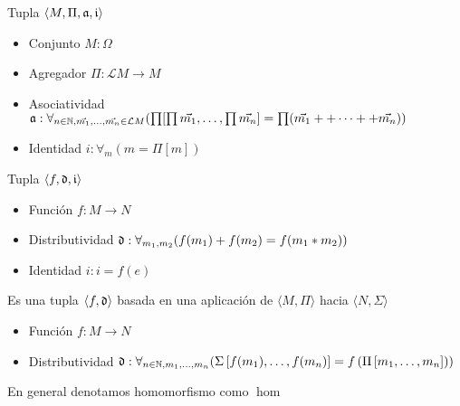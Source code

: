 \begin{defn}[Agregación]
\end{defn}
Tupla $\langle M, \Pi, \mathfrak{a}, \mathfrak{i} \rangle$  
\begin{itemize}
\item Conjunto $M: \Omega$ 
\item Agregador $\Pi: \mathcal{L} M \to M$
\item Asociatividad $\mathfrak{a}: \forall_{ n \in \mathbb{N}, \vec{m_1}, \dots, \vec{m_n} \in \mathcal{L}M}
(\prod [\prod \vec{m_1}, \dots , \prod \vec{m_n}] = \prod(\vec{m_1} ++ \dots ++ \vec{m_n}))$
\item Identidad $i: \forall_m ( m = \Pi[m])$
\end{itemize}

\begin{defn}
\end{defn}
Tupla $\langle f, \mathfrak{d}, \mathfrak{i} \rangle$ 
\begin{itemize}
\item Función $f : M \to N$ 
\item Distributividad $\mathfrak{d} : \forall_{m_1, m_2}( f(m_1) + f(m_2) = f(m_1 * m_2))$
\item Identidad ${i} : i = f(e)$
\end{itemize}

\begin{defn}
\end{defn}
Es una tupla $\langle f, \mathfrak{d} \rangle$ basada en una aplicación de $\langle M, \Pi \rangle$ hacia $\langle N, \Sigma \rangle$  
\begin{itemize}
\item Función $f: M \to N$
\item Distributividad $\mathfrak{d} : \forall_{ n \in \mathbb{N}, m_1, \dots, m_n }( \Sigma \left[f(m_1), \dots, f(m_n)\right] = f\left(\Pi \left[m_1, \dots, m_n\right]\right))$
\end{itemize}

\begin{note}
En general denotamos homomorfismo como  $\hom$
\end{note}


